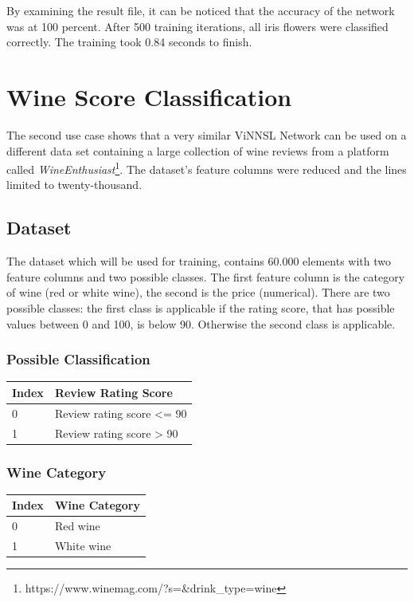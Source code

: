 By examining the result file, it can be noticed that the accuracy of the
network was at 100 percent. After 500 training iterations, all iris
flowers were classified correctly. The training took 0.84 seconds to
finish.

\section{Wine Score Classification}\label{wine-score-classification}

The second use case shows that a very similar ViNNSL Network can be used
on a different data set containing a large collection of wine reviews
from a platform called \emph{WineEnthusiast}\footnote{https://www.winemag.com/?s=\&drink\_type=wine}.
The dataset's feature columns were reduced and the lines limited to
twenty-thousand.

\subsection{Dataset}\label{dataset-1}

The dataset which will be used for training, contains 60.000 elements
with two feature columns and two possible classes. The first feature
column is the category of wine (red or white wine), the second is the
price (numerical). There are two possible classes: the first class is
applicable if the rating score, that has possible values between 0 and
100, is below 90. Otherwise the second class is applicable.

\subsubsection{Possible Classification}\label{possible-classification}

\begin{longtable}[]{@{}ll@{}}
\toprule
Index & Review Rating Score\tabularnewline
\midrule
\endhead
0 & Review rating score \textless{}= 90\tabularnewline
1 & Review rating score \textgreater{} 90\tabularnewline
\bottomrule
\end{longtable}

\subsubsection{Wine Category}\label{wine-category}

\begin{longtable}[]{@{}ll@{}}
\toprule
Index & Wine Category\tabularnewline
\midrule
\endhead
0 & Red wine\tabularnewline
1 & White wine\tabularnewline
\bottomrule
\end{longtable}

